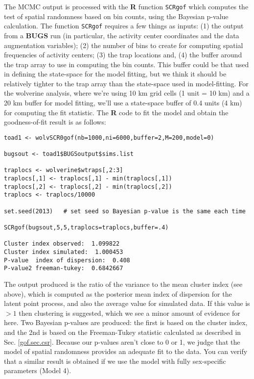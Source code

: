 The MCMC output is processed with  the {\bf R} function
\mbox{\tt SCRgof} which
computes the test of spatial randomness based on bin counts, using the 
Bayesian p-value calculation. The function \mbox{\tt SCRgof} requires
 a few things as inputs: (1) the output from a
{\bf BUGS} run (in particular, the activity center coordinates and the
data augmentation variables); (2) the number of bins to create for
computing spatial frequencies of activity centers;  (3) the trap
locations and, (4) the buffer
around the trap array to use in computing the bin counts.  This buffer could be that used
in defining the state-space for the model fitting, but we think it should be
relatively tighter to the trap array than the state-space used in
model-fitting. For the wolverine analysis,  where we're using 10 km grid cells
(1 unit = 10 km) and a 20 km buffer for model fitting, we'll use a
state-space buffer of  0.4 units (4 km) for
computing the fit statistic.
The {\bf R} code to fit the model and obtain the goodness-of-fit
result is as follows:
\begin{verbatim}
toad1 <- wolvSCR0gof(nb=1000,ni=6000,buffer=2,M=200,model=0)

bugsout <- toad1$BUGSoutput$sims.list

traplocs <- wolverine$wtraps[,2:3]
traplocs[,1] <- traplocs[,1] - min(traplocs[,1])
traplocs[,2] <- traplocs[,2] - min(traplocs[,2])
traplocs <- traplocs/10000

set.seed(2013)   # set seed so Bayesian p-value is the same each time

SCRgof(bugsout,5,5,traplocs=traplocs,buffer=.4)

Cluster index observed:  1.099822
Cluster index simulated:  1.000453
P-value  index of dispersion:  0.408
P-value2 freeman-tukey:  0.6842667
\end{verbatim}
The output produced is the ratio of the variance to the mean cluster
index (see above), which is computed as the posterior mean index of
dispersion for the latent point process, and also the average value
for simulated data. If this value is $>1$ then clustering is
suggested, which we see a minor amount of evidence for here. Two
Bayesian p-values are produced: the first is based on the cluster
index, and the 2nd is based on the Freeman-Tukey statistic calculated
as described in Sec. \ref{gof.sec.csr}.  Because our p-values aren't
close to 0 or 1, we judge that the model of spatial randomness
provides an adequate fit to the data. You can verify that a similar result is obtained if
we use the model with fully sex-specific parameters (Model 4).

